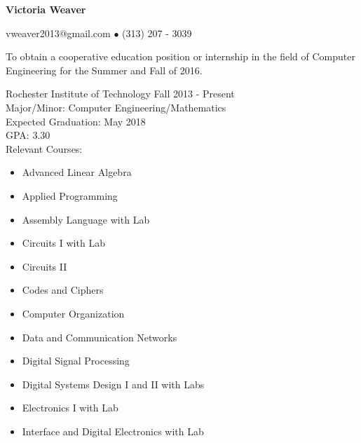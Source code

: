 \documentclass[10pt]{article} %
\begin{document}
	\centerline{\LARGE \bf Victoria Weaver}
	\centerline{vweaver2013@gmail.com $\bullet$ (313) 207 - 3039}
\noindent\makebox[\linewidth]{\rule{\textwidth}{1pt}}

\bigskip


\newline
	To obtain a cooperative education position or internship in the field of Computer Engineering for the Summer and Fall of 2016.


\bigskip


\newline
	Rochester Institute of Technology	\hfill Fall 2013 - Present
	\\ Major/Minor: Computer Engineering/Mathematics
	\\ Expected Graduation: May 2018
	\\ GPA: 3.30
	\\ Relevant Courses: \begin{multicols}{3}
		\begin{itemize}
			\itemsep0em 
			\item Advanced Linear Algebra
			\item Applied Programming
			\item Assembly Language with Lab
			\item Circuits I with Lab
			\item Circuits II
			\item Codes and Ciphers
			\item Computer Organization
			\item Data and Communication Networks
			\item Digital Signal Processing
			\item Digital Systems Design I and II with Labs
			\item Electronics I with Lab
			\item Interface and Digital Electronics with Lab
			
		\end{itemize}
		\end{multicols}
\end{document}
